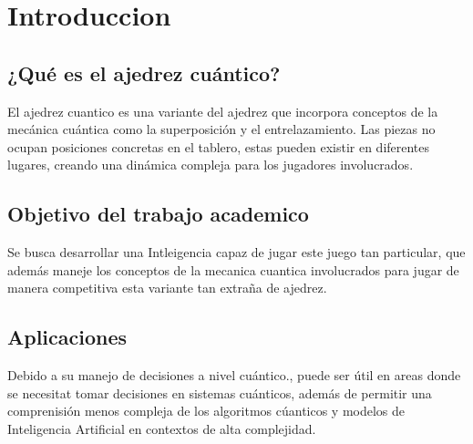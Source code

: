 \section{Introduccion}
\subsection{¿Qué es el ajedrez cuántico?}
El ajedrez cuantico es una variante del ajedrez que 
incorpora conceptos de la mecánica cuántica como la superposición y
el entrelazamiento. Las piezas no ocupan posiciones concretas en el tablero, 
estas pueden existir en diferentes lugares, creando una dinámica compleja
para los jugadores involucrados.
\subsection{Objetivo del trabajo academico}
Se busca desarrollar una Intleigencia capaz de jugar este
juego tan particular, que además maneje los conceptos de la 
mecanica cuantica involucrados para jugar de manera competitiva esta 
variante tan extraña de ajedrez.
\subsection{Aplicaciones}
Debido a su manejo de decisiones a nivel cuántico., puede ser útil
en areas donde se necesitat tomar decisiones en sistemas cuánticos, además
de permitir una comprenisión menos compleja de los algoritmos cúanticos y modelos de Inteligencia Artificial
en contextos de alta complejidad.


